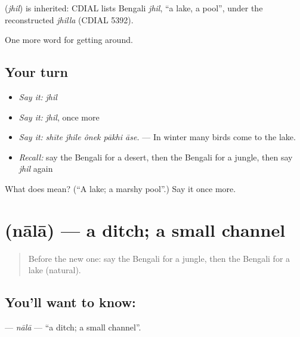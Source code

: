 \begin{cousinweb}
\textbf{} (\emph{jhil}) is inherited: CDIAL lists Bengali \emph{jhil}, \textquotedblleft{}a lake, a pool\textquotedblright{}, under the reconstructed \emph{jhilla} (CDIAL 5392).
\end{cousinweb}

\begin{grammarlens}[title={What you've built}]
One more word for getting around.
\end{grammarlens}

\subsection*{Your turn}
\begin{itemize}
\raggedright
  \item \emph{Say it:} \emph{jhil}
  \item \emph{Say it:} \emph{jhil}, once more
  \item \emph{Say it:} \emph{shīte jhile ônek pākhi āse.} — In winter many birds come to the lake.
  \item \emph{Recall:} say the Bengali for a desert, then the Bengali for a jungle, then say \emph{jhil} again
\end{itemize}

\begin{tcolorbox}[breakable,colback=teal!4,colframe=teal!35!black,title={Before you move on}]
What does  mean? (\textquotedblleft{}A lake; a marshy pool\textquotedblright{}.) Say it once more.
\end{tcolorbox}
\section[\texorpdfstring{\bn{নালা} (nālā)}{নালা (nālā)}]{ (nālā) — a ditch; a small channel}

\label{lesson:BN-C433-nala}



\begin{quote}
Before the new one: say the Bengali for a jungle, then the Bengali for a lake (natural).
\end{quote}

\subsection*{You'll want to know: }
\textbf{} — \emph{nālā} — \textquotedblleft{}a ditch; a small channel\textquotedblright{}.

